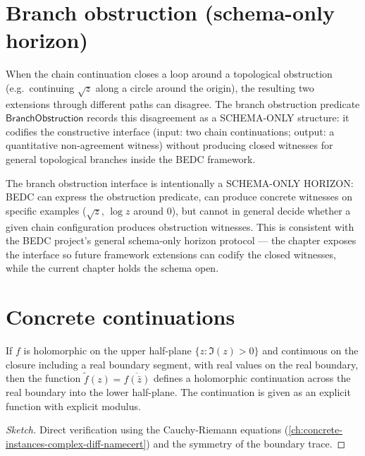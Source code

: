 \section{Branch obstruction (schema-only horizon)}

\begin{definition}
\label{def:branch-obstruction-schema}
When the chain continuation closes a loop around a topological obstruction (e.g.\ continuing \(\sqrt{z}\) along a circle around the origin), the resulting two extensions through different paths can disagree. The branch obstruction predicate \(\mathsf{BranchObstruction}\) records this disagreement as a SCHEMA-ONLY structure: it codifies the constructive interface (input: two chain continuations; output: a quantitative non-agreement witness) without producing closed witnesses for general topological branches inside the BEDC framework.
\end{definition}

\begin{remark}
\label{rem:branch-obstruction-horizon}
The branch obstruction interface is intentionally a SCHEMA-ONLY HORIZON: BEDC can express the obstruction predicate, can produce concrete witnesses on specific examples (\(\sqrt{z}\), \(\log z\) around 0), but cannot in general decide whether a given chain configuration produces obstruction witnesses. This is consistent with the BEDC project's general schema-only horizon protocol --- the chapter exposes the interface so future framework extensions can codify the closed witnesses, while the current chapter holds the schema open.
\end{remark}

\section{Concrete continuations}

\begin{theorem}
\label{thm:schwartz-reflection}
If \(f\) is holomorphic on the upper half-plane \(\{z : \Im(z) > 0\}\) and continuous on the closure including a real boundary segment, with real values on the real boundary, then the function \(\tilde{f}(z) = \overline{f(\bar{z})}\) defines a holomorphic continuation across the real boundary into the lower half-plane. The continuation is given as an explicit function with explicit modulus.
\end{theorem}
\begin{proof}[Sketch]
Direct verification using the Cauchy-Riemann equations (\autoref{ch:concrete-instances-complex-diff-namecert}) and the symmetry of the boundary trace.
\end{proof}

